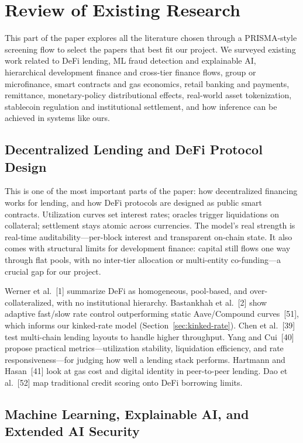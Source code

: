 \documentclass[12pt, a4paper]{report}
\begin{document}
\section{Review of Existing Research}
\label{sec:review-existing}

This part of the paper explores all the literature chosen through a PRISMA-style screening flow to select the papers that best fit our project. We surveyed existing work related to DeFi lending, ML fraud detection and explainable AI, hierarchical development finance and cross-tier finance flows, group or microfinance, smart contracts and gas economics, retail banking and payments, remittance, monetary-policy distributional effects, real-world asset tokenization, stablecoin regulation and institutional settlement, and how inference can be achieved in systems like ours.

\subsection{Decentralized Lending and DeFi Protocol Design}

This is one of the most important parts of the paper: how decentralized financing works for lending, and how DeFi protocols are designed as public smart contracts. Utilization curves set interest rates; oracles trigger liquidations on collateral; settlement stays atomic across currencies. The model's real strength is real-time auditability---per-block interest and transparent on-chain state. It also comes with structural limits for development finance: capital still flows one way through flat pools, with no inter-tier allocation or multi-entity co-funding---a crucial gap for our project.

Werner et al.~[1] summarize DeFi as homogeneous, pool-based, and over-collateralized, with no institutional hierarchy. Bastankhah et al.~[2] show adaptive fast/slow rate control outperforming static Aave/Compound curves~[51], which informs our kinked-rate model (Section~\ref{sec:kinked-rate}). Chen et al.~[39] test multi-chain lending layouts to handle higher throughput. Yang and Cui~[40] propose practical metrics---utilization stability, liquidation efficiency, and rate responsiveness---for judging how well a lending stack performs. Hartmann and Hasan~[41] look at gas cost and digital identity in peer-to-peer lending. Dao et al.~[52] map traditional credit scoring onto DeFi borrowing limits.

\subsection{Machine Learning, Explainable AI, and Extended AI Security}
\end{document}

